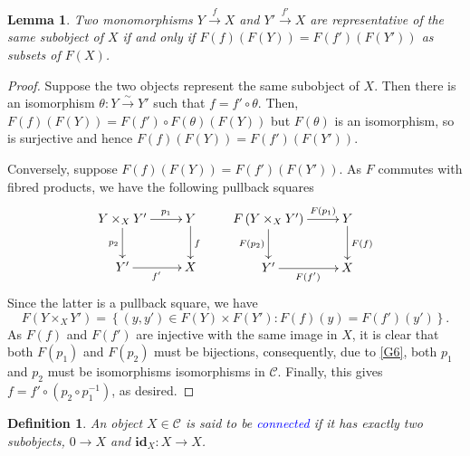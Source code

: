 \documentclass[10pt]{article}
\theoremstyle{thmstyle}
\newtheorem{lemma}[theorem]{Lemma}
\theoremstyle{defstyle}
\newtheorem{definition}[theorem]{Definition}
\newcommand{\id}{\mathbf{id}}
\newcommand{\scrC}{\mathscr{C}} %
\newcommand{\define}[1]{\textcolor{blue}{\textit{#1}}}
\begin{document}
\begin{lemma}
    Two monomorphisms $Y\xrightarrow{f} X$ and $Y'\xrightarrow{f'} X$ are representative of the same subobject of $X$ if and only if $F(f)\left(F(Y)\right) = F(f')\left(F(Y')\right)$ as subsets of $F(X)$.
\end{lemma}
\begin{proof}
    Suppose the two objects represent the same subobject of $X$. Then there is an isomorphism $\theta: Y\xrightarrow{\sim} Y'$ such that $f = f'\circ\theta$. Then, $F(f)\left(F(Y)\right) = F(f')\circ F(\theta)\left(F(Y)\right)$ but $F(\theta)$ is an isomorphism, so is surjective and hence $F(f)\left(F(Y)\right) = F(f')\left(F(Y')\right)$.

    Conversely, suppose $F(f)\left(F(Y)\right) = F(f')\left(F(Y')\right)$. As $F$ commutes with fibred products, we have the following pullback squares 
    \begin{equation*}
        \xymatrix {
            Y\times_X Y'\ar[r]^-{p_1}\ar[d]_{p_2} & Y\ar[d]^f\\
            Y'\ar[r]_{f'} & X
        }
        \qquad 
        \xymatrix {
            F\left(Y\times_X Y'\right)\ar[r]^-{F(p_1)}\ar[d]_{F(p_2)} & Y\ar[d]^{F(f)}\\
            Y'\ar[r]_{F(f')} & X
        }
    \end{equation*}
    Since the latter is a pullback square, we have 
    \begin{equation*}
        F\left(Y\times_X Y'\right) = \left\{(y, y')\in F(Y)\times F(Y')\colon F(f)(y) = F(f')(y')\right\}.
    \end{equation*}
    As $F(f)$ and $F(f')$ are injective with the same image in $X$, it is clear that both $F(p_1)$ and $F(p_2)$ must be bijections, consequently, due to \ref{G6}, both $p_1$ and $p_2$ must be isomorphisms isomorphisms in $\scrC$. Finally, this gives $f = f'\circ(p_2\circ p_1^{-1})$, as desired.
\end{proof}

\begin{definition}
    An object $X\in\scrC$ is said to be \define{connected} if it has exactly two subobjects, $0\to X$ and $\id_X: X\to X$.
\end{definition}
\end{document}

